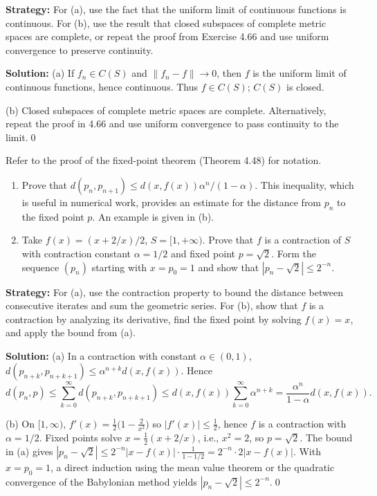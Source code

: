 \noindent\textbf{Strategy:} For (a), use the fact that the uniform limit of continuous functions is continuous. For (b), use the result that closed subspaces of complete metric spaces are complete, or repeat the proof from Exercise 4.66 and use uniform convergence to preserve continuity.

\bigskip\noindent\textbf{Solution:}
(a) If $f_n\in C(S)$ and $\|f_n-f\|\to 0$, then $f$ is the uniform limit of continuous functions, hence continuous. Thus $f\in C(S)$; $C(S)$ is closed.

(b) Closed subspaces of complete metric spaces are complete. Alternatively, repeat the proof in 4.66 and use uniform convergence to pass continuity to the limit.\qed



\begin{problembox}
Refer to the proof of the fixed-point theorem (Theorem 4.48) for notation.
\begin{enumerate}[label=(\alph*)]
\item Prove that $d(p_n, p_{n+1}) \leq d(x, f(x)) \alpha^n / (1 - \alpha)$. This inequality, which is useful in numerical work, provides an estimate for the distance from $p_n$ to the fixed point $p$. An example is given in (b).
\item Take $f(x) = (x + 2/x)/2$, $S = [1, +\infty)$. Prove that $f$ is a contraction of $S$ with contraction constant $\alpha = 1/2$ and fixed point $p = \sqrt{2}$. Form the sequence $(p_n)$ starting with $x=p_0=1$ and show that $|p_n - \sqrt{2}| \le 2^{-n}$.
\end{enumerate}
\end{problembox}

\noindent\textbf{Strategy:} For (a), use the contraction property to bound the distance between consecutive iterates and sum the geometric series. For (b), show that $f$ is a contraction by analyzing its derivative, find the fixed point by solving $f(x) = x$, and apply the bound from (a).

\bigskip\noindent\textbf{Solution:}
(a) In a contraction with constant $\alpha\in(0,1)$, $d(p_{n+k},p_{n+k+1})\le \alpha^{n+k}d(x,f(x))$. Hence
\[
d(p_n,p)\le \sum_{k=0}^{\infty} d(p_{n+k},p_{n+k+1})\le d(x,f(x))\sum_{k=0}^{\infty}\alpha^{n+k}=\frac{\alpha^n}{1-\alpha}d(x,f(x)).
\]

(b) On $[1,\infty)$, $f'(x)=\tfrac12\big(1-\tfrac{2}{x^2}\big)$ so $|f'(x)|\le \tfrac12$, hence $f$ is a contraction with $\alpha=1/2$. Fixed points solve $x=\tfrac12(x+2/x)$, i.e., $x^2=2$, so $p=\sqrt2$. The bound in (a) gives $|p_n-\sqrt2|\le 2^{-n}|x-f(x)|\cdot\tfrac{1}{1-1/2}=2^{-n}\cdot 2|x-f(x)|$. With $x=p_0=1$, a direct induction using the mean value theorem or the quadratic convergence of the Babylonian method yields $|p_n-\sqrt2|\le 2^{-n}$.\qed



